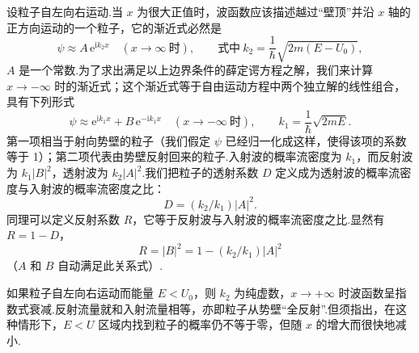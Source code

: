 设粒子自左向右运动.当 $x$ 为很大正值时，波函数应该描述越过“壁顶”并沿 $x$ 轴的正方向运动的一个粒子，它的渐近式必然是
\begin{equation}
  \psi\approx A\,\mathrm{e}^{\mathrm{i}k_2x}
  \quad\left(x\to\infty\ \text{时}\right),
  \qquad\text{式中}\ k_2=\frac{1}{\hbar}\sqrt{2m\left(E-U_0\right)},
\end{equation}
$A$ 是一个常数.为了求出满足以上边界条件的薛定谔方程之解，我们来计算 $x\to-\infty$ 时的渐近式；这个渐近式等于自由运动方程中两个独立解的线性组合，具有下列形式
\begin{equation}
  \psi\approx\mathrm{e}^{\mathrm{i}k_1x}+B\,\mathrm{e}^{-\mathrm{i}k_1x}
  \quad\left(x\to-\infty\ \text{时}\right),
  \qquad
  k_1=\frac{1}{\hbar}\sqrt{2mE}.
\end{equation}
第一项相当于射向势壁的粒子（我们假定 $\psi$ 已经归一化成这样，使得该项的系数等于 1）；第二项代表由势壁反射回来的粒子.入射波的概率流密度为 $k_1$，而反射波为 $k_1|B|^2$，透射波为 $k_2|A|^2$.我们把粒子的透射系数 $D$ 定义成为透射波的概率流密度与入射波的概率流密度之比：
\begin{equation}
  D=\left(k_2/k_1\right)|A|^2.
\end{equation}
同理可以定义反射系数 $R$，它等于反射波与入射波的概率流密度之比.显然有 $R=1-D$，
\begin{equation}
  R=|B|^2=1-\left(k_2/k_1\right)|A|^2
\end{equation}
（$A$ 和 $B$ 自动满足此关系式）.

如果粒子自左向右运动而能量 $E<U_0$，则 $k_2$ 为纯虚数，$x\to+\infty$ 时波函数呈指数式衰减.反射流量就和入射流量相等，亦即粒子从势壁“全反射”.但须指出，在这种情形下，$E<U$ 区域内找到粒子的概率仍不等于零，但随 $x$ 的增大而很快地减小.

